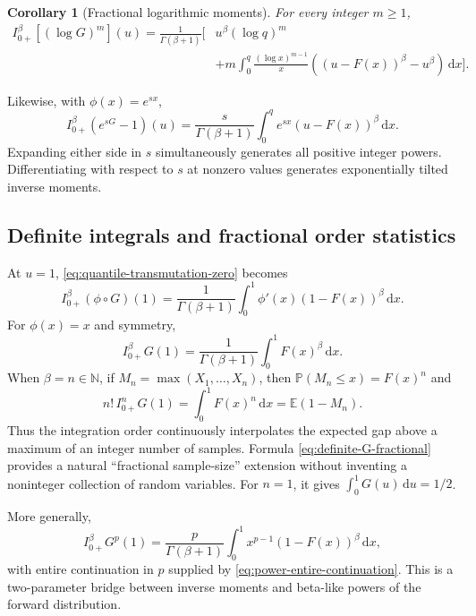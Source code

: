 \documentclass[11pt,oneside]{article}
\newtheorem{corollary}[theorem]{Corollary}
\theoremstyle{definition}
\theoremstyle{remark}
\newcommand{\N}{\mathbb N}
\newcommand{\E}{\mathbb E}
\newcommand{\Prob}{\mathbb P}
\newcommand{\dd}{\,\mathrm d}
\begin{document}
\begin{corollary}[Fractional logarithmic moments]
For every integer $m\ge1$,
\begin{align}
 I_{0+}^{\beta}\!\left[(\log G)^m\right](u)
 =\frac1{\Gamma(\beta+1)}\Bigg[
 &u^\beta(\log q)^m\\
 &+m\int_0^q\frac{(\log x)^{m-1}}x
 \left((u-F(x))^\beta-u^\beta\right)\dd x
 \Bigg].
 \label{eq:log-power-transmutation}
\end{align}
\end{corollary}

Likewise, with $\phi(x)=e^{sx}$,
\begin{equation}
 I_{0+}^{\beta}\!\left(e^{sG}-1\right)(u)
 =\frac{s}{\Gamma(\beta+1)}
  \int_0^q e^{sx}(u-F(x))^\beta\dd x.
 \label{eq:exp-quantile-transmutation}
\end{equation}
Expanding either side in $s$ simultaneously generates all positive integer
powers.  Differentiating with respect to $s$ at nonzero values generates
exponentially tilted inverse moments.

\subsection{Definite integrals and fractional order statistics}

At $u=1$, \eqref{eq:quantile-transmutation-zero} becomes
\begin{equation}
 I_{0+}^{\beta}(\phi\circ G)(1)
 =\frac1{\Gamma(\beta+1)}
  \int_0^1\phi'(x)(1-F(x))^\beta\dd x.
 \label{eq:definite-quantile-general}
\end{equation}
For $\phi(x)=x$ and symmetry,
\begin{equation}
 I_{0+}^{\beta}G(1)
 =\frac1{\Gamma(\beta+1)}\int_0^1F(x)^\beta\dd x.
 \label{eq:definite-G-fractional}
\end{equation}
When $\beta=n\in\N$, if $M_n=\max(X_1,\ldots,X_n)$, then
$\Prob(M_n\le x)=F(x)^n$ and
\begin{equation}
 n!\,I_{0+}^{n}G(1)
 =\int_0^1F(x)^n\dd x
 =\E(1-M_n).
 \label{eq:order-statistic-interpretation}
\end{equation}
Thus the integration order continuously interpolates the expected gap above
a maximum of an integer number of samples.  Formula
\eqref{eq:definite-G-fractional} provides a natural ``fractional sample-size''
extension without inventing a noninteger collection of random variables.
For $n=1$, it gives $\int_0^1G(u)\dd u=1/2$.

More generally,
\begin{equation}
 I_{0+}^{\beta}G^p(1)
 =\frac{p}{\Gamma(\beta+1)}
  \int_0^1x^{p-1}(1-F(x))^\beta\dd x,
 \label{eq:definite-power-general}
\end{equation}
with entire continuation in $p$ supplied by
\eqref{eq:power-entire-continuation}.  This is a two-parameter bridge between
inverse moments and beta-like powers of the forward distribution.
\end{document}
